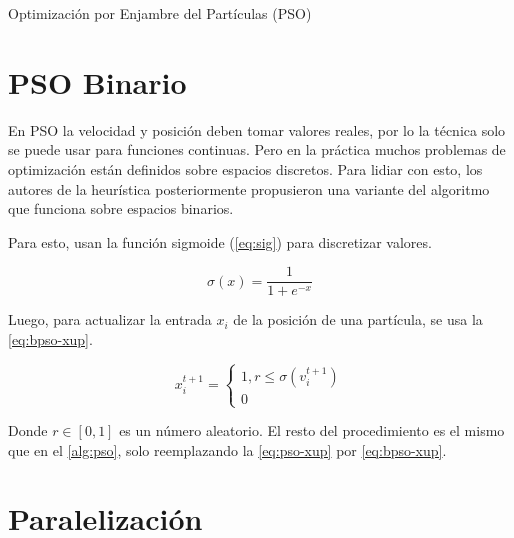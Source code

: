 \begin{algorithm}
  \caption[PSO]{Optimización por Enjambre del Partículas (PSO)}\label{alg:pso}
  \begin{algorithmic}[1]

        \EndFor{}
      \EndWhile{}
    \EndFunction{}
  \end{algorithmic}
\end{algorithm}

\section{PSO Binario}\label{sec:b-pso}

En PSO la velocidad y posición deben tomar valores reales, por lo la técnica
solo se puede usar para funciones continuas. Pero en la práctica muchos
problemas de optimización están definidos sobre espacios discretos. Para lidiar
con esto, los autores de la heurística posteriormente propusieron una variante
del algoritmo que funciona sobre espacios binarios.

Para esto, usan la función sigmoide (\cref{eq:sig}) para discretizar valores.

\begin{equation}\label{eq:sig}
  \sigma(x) = \frac{1}{1 + e^{-x}}
\end{equation}

Luego, para actualizar la entrada $x_{i}$ de la posición de una partícula, se
usa la \cref{eq:bpso-xup}.

\begin{equation}\label{eq:bpso-xup}
  x^{t+1}_{i} =
  \begin{cases}
    1, r \leq \sigma(v^{t+1}_{i}) \\
    0
  \end{cases}
\end{equation}

Donde $r \in [0, 1]$ es un número aleatorio. El resto del procedimiento es el
mismo que en el \cref{alg:pso}, solo reemplazando la \cref{eq:pso-xup} por
\cref{eq:bpso-xup}.

\section{Paralelización}